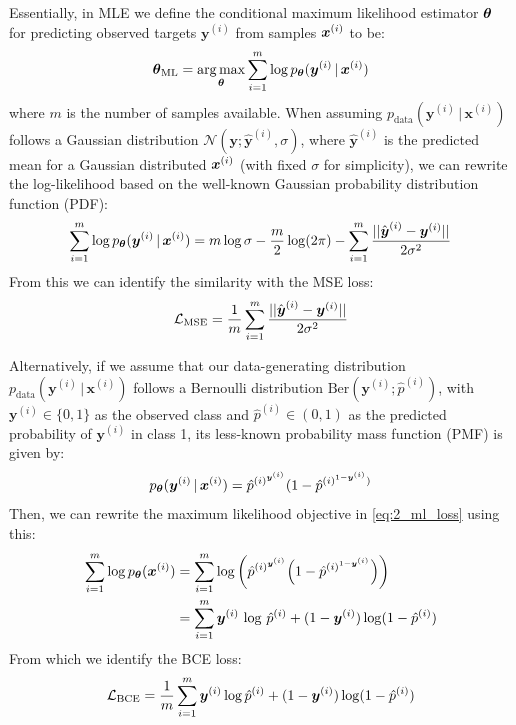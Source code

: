 Essentially, in MLE we define the conditional maximum likelihood estimator $\boldsymbol{\theta}$ for predicting observed targets $\boldsymbol{y}^{(i)}$ from samples $\boldsymbol{x}^{(i)}$ to be:
\begin{equation}
    \boldsymbol{\theta}_{\text{ML}} = \operatorname*{arg\,max}_{\boldsymbol{\theta}} \sum^m_{i=1} \log p_{\boldsymbol{\theta}}(\boldsymbol{y}^{(i)} \,|\, \boldsymbol{x}^{(i)}) 
    \label{eq:2_ml_loss}
\end{equation}
where $m$ is the number of samples available. When assuming $p_{\text{data}}(\boldsymbol{y}^{(i)} \,|\, \boldsymbol{x}^{(i)})$ follows a Gaussian distribution $\mathcal{N}(\boldsymbol{y}; \hat{\boldsymbol{y}}^{(i)}, \sigma)$, where $\hat{\boldsymbol{y}}^{(i)}$ is the predicted mean for a Gaussian distributed $\boldsymbol{x}^{(i)}$ (with fixed $\sigma$ for simplicity), we can rewrite the log-likelihood based on the well-known Gaussian probability distribution function (PDF):
\begin{equation}
    \sum^m_{i=1} \log p_{\boldsymbol{\theta}}(\boldsymbol{y}^{(i)} \,|\, \boldsymbol{x}^{(i)}) = m \log \sigma - \frac{m}{2} \log (2\pi) - \sum^m_{i=1} \frac{||\hat{\boldsymbol{y}}^{(i)} - \boldsymbol{y}^{(i)}||}{2 \sigma^2}
\end{equation}
From this we can identify the similarity with the MSE loss:
\begin{equation}
    \mathcal{L}_{\text{MSE}} = \frac{1}{m} \sum^m_{i=1} \frac{||\hat{\boldsymbol{y}}^{(i)} - \boldsymbol{y}^{(i)}||}{2 \sigma^2}
    \label{eq:2_mse_loss}
\end{equation}

Alternatively, if we assume that our data-generating distribution $p_{\text{data}}(\boldsymbol{y}^{(i)} \,|\, \boldsymbol{x}^{(i)})$ follows a Bernoulli distribution $\text{Ber}(\boldsymbol{y}^{(i)}; \hat{p}^{(i)})$, with $\boldsymbol{y}^{(i)} \in \{0, 1\}$ as the observed class and $\hat{p}^{(i)} \in (0, 1)$ as the predicted probability of $\boldsymbol{y}^{(i)}$ in class 1, its less-known probability mass function (PMF) is given by:
\begin{equation}
    p_{\boldsymbol{\theta}}(\boldsymbol{y}^{(i)} \,|\, \boldsymbol{x}^{(i)}) = \hat{p}^{{(i)}^{\boldsymbol{y}^{(i)}}}
    (1 - \hat{p}^{{(i)}^{1 - \boldsymbol{y}^{(i)}})}
\end{equation}
Then, we can rewrite the maximum likelihood objective in \eqref{eq:2_ml_loss} using this:
\begin{align}
    \sum^m_{i=1} \log p_{\boldsymbol{\theta}}(\boldsymbol{x}^{(i)}) &=  \sum^m_{i=1} \log \bigg(\hat{p}^{{(i)}^{\boldsymbol{y}^{(i)}}} \Big(1 - \hat{p}^{{(i)}^{1 - \boldsymbol{y}^{(i)}}} \Big)\bigg) \\
    &=  \sum^m_{i=1} \boldsymbol{y}^{(i)} \,\log \,\hat{p}^{(i)} +  (1 - \boldsymbol{y}^{(i)}) \log (1 - \hat{p}^{(i)})
\end{align}
From which we identify the BCE loss:
\begin{equation}
    \mathcal{L}_{\text{BCE}} = \frac{1}{m} \sum^m_{i=1} \boldsymbol{y}^{(i)} \log \hat{p}^{(i)} +  (1 - \boldsymbol{y}^{(i)}) \log (1 - \hat{p}^{(i)})
\end{equation}


